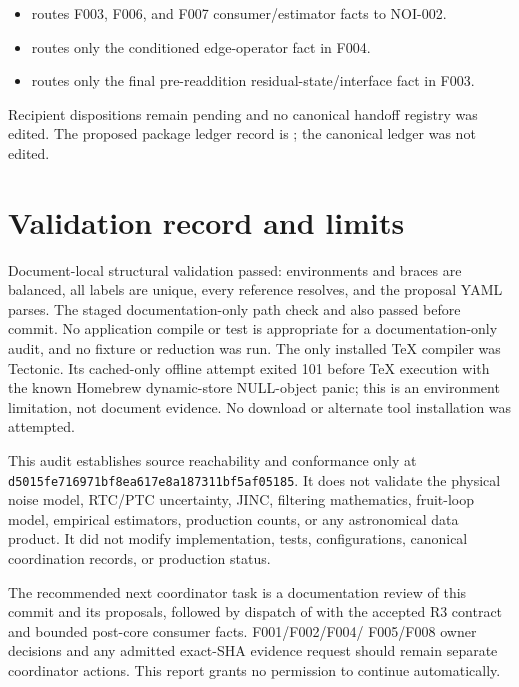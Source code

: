\documentclass[10pt]{article}
\newcommand{\appsha}{d5015fe716971bf8ea617e8a187311bf5af05185}
\begin{document}
\begin{itemize}[leftmargin=*]
  \item {}
        routes F003, F006, and F007 consumer/estimator facts to NOI-002.
  \item {}
        routes only the conditioned edge-operator fact in F004.
  \item {}
        routes only the final pre-readdition residual-state/interface fact in
        F003.
\end{itemize}

Recipient dispositions remain pending and no canonical handoff registry was
edited.  The proposed package ledger record is
; the
canonical ledger was not edited.

\section{Validation record and limits}
\label{sec:validation}

Document-local structural validation passed: environments and braces are
balanced, all labels are unique, every reference resolves, and the proposal
YAML parses.  The staged documentation-only path check and
 also passed before commit.  No application compile or
test is appropriate for a documentation-only audit, and no fixture or
reduction was run.  The only installed TeX compiler was Tectonic.  Its
cached-only offline attempt exited 101 before TeX execution with the known
Homebrew  dynamic-store NULL-object panic;
this is an environment limitation, not document evidence.  No download or
alternate tool installation was attempted.

This audit establishes source reachability and conformance only at
\texttt{\appsha}.  It does not validate the physical noise model, RTC/PTC
uncertainty, JINC, filtering mathematics, fruit-loop model, empirical
estimators, production counts, or any astronomical data product.  It did not
modify implementation, tests, configurations, canonical coordination
records, or production status.

The recommended next coordinator task is a documentation review of this
commit and its proposals, followed by dispatch of  with the
accepted R3 contract and bounded post-core consumer facts.  F001/F002/F004/
F005/F008 owner decisions and any admitted exact-SHA evidence request should
remain separate coordinator actions.  This report grants no permission to
continue automatically.
\end{document}

